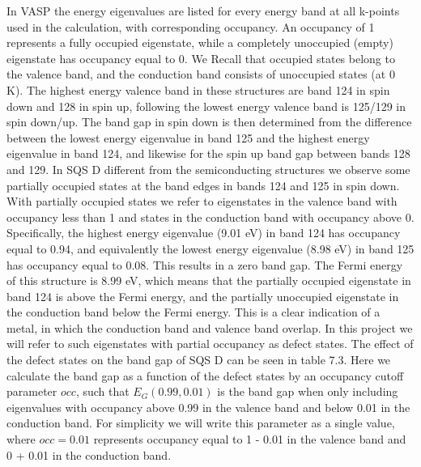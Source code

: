 In VASP the energy eigenvalues are listed for every energy band at all k-points used in the calculation, with corresponding occupancy. An occupancy of 1 represents a fully occupied eigenstate, while a completely unoccupied (empty) eigenstate has occupancy equal to 0. We Recall that occupied states belong to the valence band, and the conduction band consists of unoccupied states (at 0 K). The highest energy valence band in these structures are band 124 in spin down and 128 in spin up, following the lowest energy valence band is 125/129 in spin down/up. The band gap in spin down is then determined from the difference between the lowest energy eigenvalue in band 125 and the highest energy eigenvalue in band 124, and likewise for the spin up band gap between bands 128 and 129. In SQS D different from the semiconducting structures we observe some partially occupied states at the band edges in bands 124 and 125 in spin down. With partially occupied states we refer to eigenstates in the valence band with occupancy less than 1 and states in the conduction band with occupancy above 0. Specifically, the highest energy eigenvalue (9.01 eV) in band 124 has occupancy equal to 0.94, and equivalently the lowest energy eigenvalue (8.98 eV) in band 125 has occupancy equal to 0.08. This results in a zero band gap. The Fermi energy of this structure is 8.99 eV, which means that the partially occupied eigenstate in band 124 is above the Fermi energy, and the partially unoccupied eigenstate in the conduction band below the Fermi energy. This is a clear indication of a metal, in which the conduction band and valence band overlap. In this project we will refer to such eigenstates with partial occupancy as defect states. The effect of the defect states on the band gap of SQS D can be seen in table 7.3. Here we calculate the band gap as a function of the defect states by an occupancy cutoff parameter $occ$, such that $E_G (0.99, 0.01)$ is the band gap when only including eigenvalues with occupancy above 0.99 in the valence band and below 0.01 in the conduction band. For simplicity we will write this parameter as a single value, where $occ = 0.01$ represents occupancy equal to 1 - 0.01 in the valence band and 0 + 0.01 in the conduction band.

